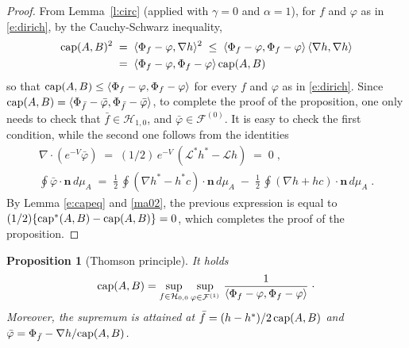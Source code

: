 \documentclass[reqno]{amsart}
\newtheorem{proposition}[theorem]{Proposition}
\newcounter{as}[section]
\newcommand{\mc}[1]{{\mathcal #1}}
\newcommand{\bs}[1]{{\boldsymbol #1}}
\newcommand{\<}{\langle}
\renewcommand{\>}{\rangle}
\renewcommand{\Cap}{{\rm cap}}
\begin{document}
\begin{proof}
From Lemma~\ref{l:circ} (applied with $\gamma=0$ and $\alpha=1$), for
$f$ and $\varphi$ as in \eqref{e:dirich}, by the Cauchy-Schwarz inequality,
\begin{equation*}
\begin{aligned}
\Cap(A,B)^2 \; & =\; \langle \Phi_f-\varphi,\nabla h\rangle^2
\;\le\; \langle \Phi_f-\varphi,\Phi_f-\varphi\rangle \,
\langle \nabla h,\nabla h\rangle  \\
& = \;
\langle \Phi_f-\varphi,\Phi_f-\varphi\rangle \, \Cap(A,B)
\end{aligned}
\end{equation*}
so that $\Cap(A,B)\le \langle \Phi_f-\varphi,\Phi_f-\varphi\rangle$
for every $f$ and $\varphi$ as in \eqref{e:dirich}.
Since $\Cap(A,B)=\langle \Phi_{\bar f}-\bar \varphi,\Phi_{\bar
  f}-\bar\varphi\rangle$, to complete the proof of the proposition,
one only needs to check that $\bar f\in \mc H_{1,0}$, and $\bar
\varphi\in \mc F^{(0)}$. It is easy to check the first condition, while
the second one follows from the identities
\begin{gather*}
\nabla \cdot (e^{-V} \bar \varphi) \;=\;
(1/2) \, e^{-V}\, \left( \mc L^* h^* -\mc L h\right)\;=\;0\;, \\
\oint \bar \varphi \cdot \bs n\, d\mu_A \;=\;
\frac 12 \,  \oint (\nabla h^* - h^* c) \cdot \bs n\, d\mu_A
\;-\; \frac 12 \,
\oint (\nabla h + h c) \cdot \bs n\, d\mu_A \;.
\end{gather*}
By Lemma \ref{e:capeq} and \eqref{ma02}, the previous expression is
equal to $(1/2) \{\Cap^*(A,B)-\Cap(A,B)\}= 0$, which completes the
proof of the proposition.
\end{proof}
\begin{proposition}[Thomson principle]
\label{p:thomp}
It holds
\begin{equation}
\label{e:thomp}
\Cap(A,B)=\sup_{f\in \mc H_{0,0}}\sup_{\varphi \in \mc F^{(1)}} \,
\frac{1}{\langle \Phi_f-\varphi,\Phi_f-\varphi\rangle}\;\cdot
\end{equation}
Moreover, the supremum is attained at $\bar f=(h-h^*)/2\, \Cap(A,B)$ and
$\bar \varphi=\Phi_{\bar f}- \nabla h/\Cap(A,B)$.
\end{proposition}
\end{document}
